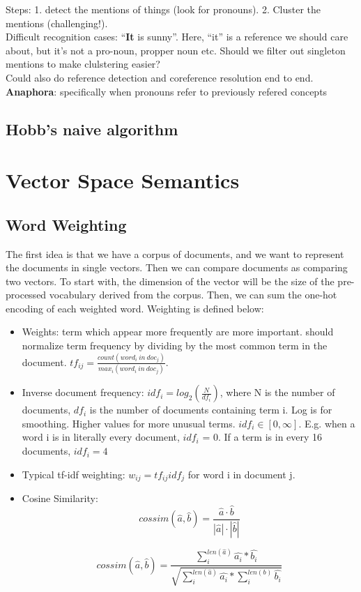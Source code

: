 \documentclass[]{article}
\begin{document}
	Steps: 1. detect the mentions of things (look for pronouns). 2. Cluster the mentions (challenging!). \\
	
	Difficult recognition cases: ``\textbf{It} is sunny''. Here, ``it'' is a reference we should care about, but it's not a pro-noun, propper noun etc. Should we filter out singleton mentions to make clulstering easier? \\
	
	Could also do reference detection and coreference resolution end to end.\\

	\textbf{Anaphora}: specifically when pronouns refer to previously refered concepts
	
	\subsection{Hobb's naive algorithm}
	
	\clearpage
	\section{Vector Space Semantics}
    
    \subsection{Word Weighting}
    
    The first idea is that we have a corpus of documents, and we want to represent the documents in single vectors. Then we can compare documents as comparing two vectors. To start with, the dimension of the vector will be the size of the pre-processed vocabulary derived from the corpus. Then, we can sum the one-hot encoding of each weighted word. Weighting is defined below:
    
    \begin{itemize}
     \item Weights: term which appear more frequently  are more important. should normalize term frequency by dividing by the most common term in the document. $tf_{ij} = \frac{count(word_i \: in \: doc_j)}{max_i(word_i \: in \: doc_j)}$. 
     \item Inverse document frequency: $idf_i = log_2(\frac{N}{df_i})$, where N is the number of documents, $df_i$ is the number of documents containing term i. Log is for smoothing. Higher values for more unusual terms. $idf_i \in [0, \infty]$. E.g. when a word i is in literally every document, $idf_i$ = 0. If a term is in every 16 documents, $idf_i = 4$
     \item Typical tf-idf weighting: $w_{ij} = tf_{ij}idf_j$ for word i in document j.
     \item Cosine Similarity: $$cossim(\hat{a}, \hat{b}) = \frac{\hat{a} \cdot \hat{b}}{|\hat{a}| \cdot |\hat{b}|}$$
     
     $$cossim(\hat{a}, \hat{b}) 
     = \frac
     {\sum_i^{len(\hat{a})} \hat{a_i} * \hat{b_i}}
     {\sqrt{\sum_i^{len(\hat{a})}\hat{a_i} * \sum_i^{len(b)}\hat{b_i}}}$$
     
    \end{itemize}
    
\end{document}
